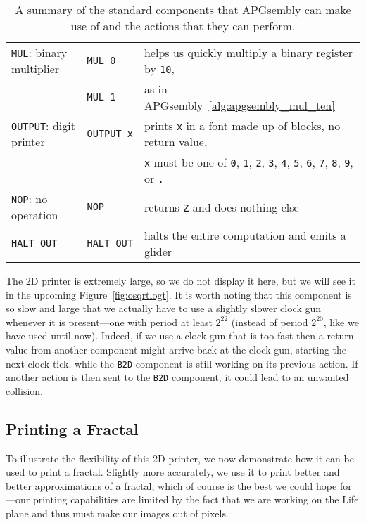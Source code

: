 \begin{table}[!phtb]
\begin{tabular}{lll}
			\texttt{MUL}: binary multiplier & \texttt{MUL 0} & helps us quickly multiply a binary register by \texttt{10}, \\
			& \texttt{MUL 1} & as in APGsembly~\ref{alg:apgsembly_mul_ten} \\\midrule
			\texttt{OUTPUT}: digit printer & \texttt{OUTPUT x} & prints \texttt{x} in a font made up of blocks, no return value,\\
			& & \texttt{x} must be one of \texttt{0}, \texttt{1}, \texttt{2}, \texttt{3}, \texttt{4}, \texttt{5}, \texttt{6}, \texttt{7}, \texttt{8}, \texttt{9}, or \texttt{.}\\\midrule
			
			\texttt{NOP}: no operation & \texttt{NOP} & returns \texttt{Z} and does nothing else\\\midrule
			
			\texttt{HALT\_OUT} & \texttt{HALT\_OUT} & halts the entire computation and emits a glider\\
			\bottomrule
		\end{tabular}
	\caption{A summary of the standard components that APGsembly can make use of and the actions that they can perform.}\label{tab:universal_computation_components}
\end{table}

The 2D printer is extremely large, so we do not display it here, but we will see it in the upcoming Figure~\ref{fig:osqrtlogt}. It is worth noting that this component is so slow and large that we actually have to use a slightly slower clock gun whenever it is present---one with period at least $2^{22}$ (instead of period $2^{20}$, like we have used until now). Indeed, if we use a clock gun that is too fast then a return value from another component might arrive back at the clock gun, starting the next clock tick, while the \texttt{B2D} component is still working on its previous action. If another action is then sent to the \texttt{B2D} component, it could lead to an unwanted collision.


\subsection{Printing a Fractal}\label{sec:koch_snowflake}

To illustrate the flexibility of this 2D printer, we now demonstrate how it can be used to print a fractal. Slightly more accurately, we use it to print better and better approximations of a fractal, which of course is the best we could hope for---our printing capabilities are limited by the fact that we are working on the Life plane and thus must make our images out of pixels.

